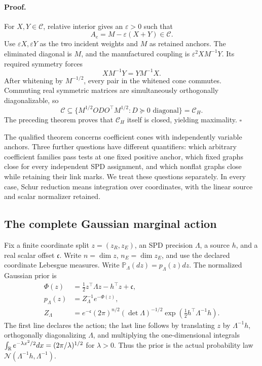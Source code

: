 \paragraph{Proof.}
For \(X,Y\in\mathcal C\), relative interior gives an
\(\varepsilon>0\) such that
\[
A_e=M-\varepsilon(X+Y)\in\mathcal C.
\]
Use \(\varepsilon X,\varepsilon Y\) as the two incident weights and \(M\)
as retained anchors. The eliminated diagonal is \(M\), and the manufactured
coupling is \(\varepsilon^2XM^{-1}Y\). Its required symmetry forces
\[
XM^{-1}Y=YM^{-1}X.
\]
After whitening by \(M^{-1/2}\), every pair in the whitened cone commutes.
Commuting real symmetric matrices are simultaneously orthogonally
diagonalizable, so
\[
\mathcal C\subseteq
\{M^{1/2}ODO^\top M^{1/2}:D\succeq0\text{ diagonal}\}
=\mathcal C_H.
\]
The preceding theorem proves that \(\mathcal C_H\) itself is closed, yielding
maximality. \(\square\)

The qualified theorem concerns coefficient cones with independently variable
anchors. Three further questions have different quantifiers: which arbitrary
coefficient families pass tests at one fixed positive anchor, which fixed
graphs close for every independent SPD assignment, and which nonflat graphs
close while retaining their link marks. We treat these questions separately.
In every case, Schur reduction means integration over coordinates, with the
linear source and scalar normalizer retained. 

\subsection{The complete Gaussian marginal action}
\label{sec:cg-kron-normalized-action}

Fix a finite coordinate split \(z=(z_R,z_E)\), an SPD precision
\(\Lambda\), a source \(h\), and a real scalar offset \(\mathfrak c\).
Write \(n=\dim z\), \(n_E=\dim z_E\), and use the declared coordinate
Lebesgue measures. Write \(\mathbb P_\Lambda(dz)=p_\Lambda(z)dz\). The normalized
Gaussian prior is
\begin{equation}
\begin{aligned}
\Phi(z)&=\frac12z^\top\Lambda z-h^\top z+\mathfrak c,\\
p_\Lambda(z)&=Z_\Lambda^{-1}e^{-\Phi(z)},\\
Z_\Lambda&=e^{-\mathfrak c}(2\pi)^{n/2}
(\det\Lambda)^{-1/2}
\exp\left(\frac12h^\top\Lambda^{-1}h\right).
\end{aligned}
\label{eq:cg-kron-normalized-prior}
\end{equation}
The first line declares the action; the last line follows by translating
\(z\) by \(\Lambda^{-1}h\), orthogonally diagonalizing \(\Lambda\), and
multiplying the one-dimensional integrals
\(\int_{\mathbb R}e^{-\lambda x^2/2}dx=(2\pi/\lambda)^{1/2}\) for
\(\lambda>0\). Thus the prior is the actual probability law
\(\mathcal N(\Lambda^{-1}h,\Lambda^{-1})\).

